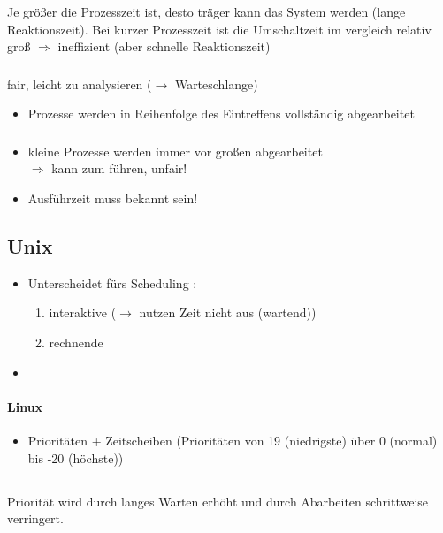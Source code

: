 Je größer die Prozesszeit ist, desto träger kann das System werden (lange Reaktionszeit). Bei kurzer Prozesszeit ist die Umschaltzeit im vergleich relativ groß $\Rightarrow$ ineffizient (aber schnelle Reaktionszeit)

\subsubsection[FIFO/FCFS]{}
fair, leicht zu analysieren ($\to$ Warteschlange)
\begin{itemize}
\item Prozesse werden in Reihenfolge des Eintreffens vollständig abgearbeitet
\end{itemize}
\subsubsection[Shortest Job Next (SJN)]{}
\begin{itemize}
\item kleine Prozesse werden immer vor großen abgearbeitet\\
$\Rightarrow$ kann zum  führen, unfair!
\item Ausführzeit muss bekannt sein!
\end{itemize}

\subsection{Unix}
\begin{itemize}
\item Unterscheidet fürs Scheduling :
\begin{enumerate}
\item interaktive ($\to$ nutzen Zeit nicht aus (wartend))
\item rechnende
\end{enumerate}
\item {}
\end{itemize}

\paragraph{Linux}
\begin{itemize}
\item Prioritäten + Zeitscheiben (Prioritäten von 19 (niedrigste) über 0 (normal) bis -20 (höchste))
\end{itemize}

\subsection[Priority Boost]{}
Priorität wird durch langes Warten erhöht und durch Abarbeiten schrittweise verringert.

